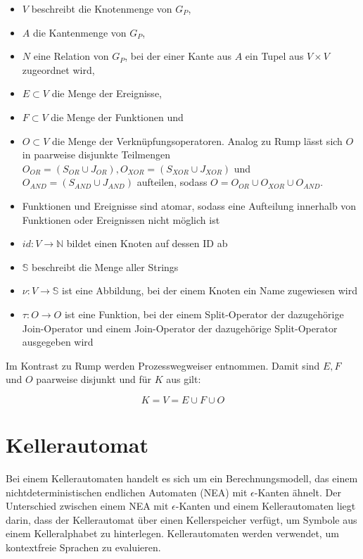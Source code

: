 \begin{itemize}
    \item $V$ beschreibt die Knotenmenge von $G_P$,
    \item $A$ die Kantenmenge von $G_P$,
    \item $N$ eine Relation von $G_P$, bei der einer Kante aus $A$ ein Tupel aus $V \times V$ zugeordnet wird,
    \item $E \subset V$ die Menge der Ereignisse,
    \item $F \subset V$ die Menge der Funktionen und
    \item $O \subset V$ die Menge der Verknüpfungsoperatoren. Analog zu Rump \cite{rump_geschaftsprozesmanagement_1999} lässt sich 
    $O$ in paarweise disjunkte Teilmengen $O_{OR} = (S_{OR} \cup J_{OR}), O_{XOR} = (S_{XOR} \cup J_{XOR})$ und $O_{AND} = (S_{AND} \cup J_{AND})$ aufteilen, sodass $O = O_{OR} \cup O_{XOR} \cup O_{AND}$.
    \item Funktionen und Ereignisse sind atomar, sodass eine Aufteilung innerhalb von Funktionen oder Ereignissen nicht möglich ist
    \item $id: V \rightarrow \mathbb{N}$ bildet einen Knoten auf dessen \ac{ID} ab
    \item $\mathbb{S}$ beschreibt die Menge aller Strings
    \item $\nu: V \rightarrow \mathbb{S}$ ist eine Abbildung, bei der einem Knoten ein Name zugewiesen wird
    \item $\tau: O \rightarrow O$ ist eine Funktion, bei der einem Split-Operator der dazugehörige Join-Operator und einem Join-Operator der dazugehörige Split-Operator ausgegeben wird
\end{itemize}

\noindent Im Kontrast zu Rump \cite{rump_geschaftsprozesmanagement_1999} werden Prozesswegweiser entnommen. Damit sind $E, F$ und $O$ paarweise disjunkt und für $K$ aus \cite{rump_geschaftsprozesmanagement_1999} gilt:
    
$$K = V = E \cup F \cup O$$


\section{Kellerautomat}
\label{kellerautomat-definition}

Bei einem Kellerautomaten handelt es sich um ein Berechnungsmodell, das einem nichtdeterministischen endlichen Automaten (\acs{NEA}) mit $\epsilon$-Kanten ähnelt. 
Der Unterschied zwischen einem \acs{NEA} mit $\epsilon$-Kanten und einem Kellerautomaten liegt darin, dass der Kellerautomat über einen Kellerspeicher verfügt, um Symbole 
aus einem Kelleralphabet zu hinterlegen. Kellerautomaten werden verwendet, um kontextfreie Sprachen zu evaluieren. \cite{hopcroft_einfuhrung_nodate}

